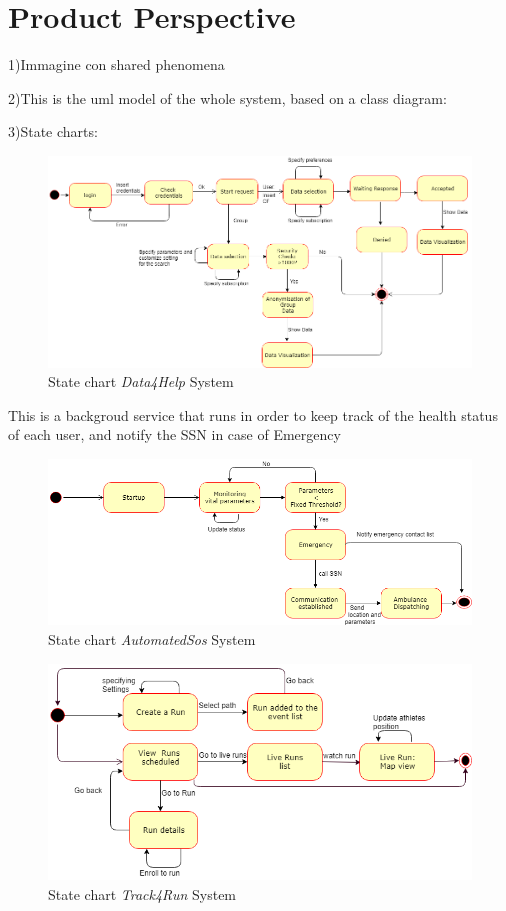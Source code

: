 \section{Product Perspective}
1)Immagine con shared phenomena

2)This is the uml model of  the whole system, based on a class diagram:

3)State charts:

\begin{figure}[H]
    \centering
    \includegraphics[scale=0.4]{Pictures/state chart 1.png}
    \caption{State chart  \emph{Data4Help} System}
\end{figure}
\newpage
This is a backgroud service that runs in order to keep track of the health status of each user, and notify the SSN in case of Emergency 
\begin{figure}[H]
    \centering
    \includegraphics[scale=0.4]{Pictures/state chart 2.png}
    \caption{State chart  \emph{AutomatedSos} System}
\end{figure}
\begin{figure}[H]
    \centering
    \includegraphics[scale=0.4]{Pictures/statechart3.png}
    \caption{State chart  \emph{Track4Run} System}
\end{figure}